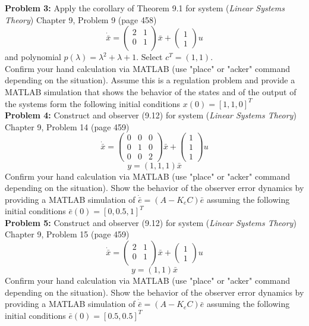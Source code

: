 \documentclass[12pt]{article}
\begin{document}
\noindent
\textbf{Problem 3:} Apply the corollary of Theorem 9.1 for system ({\em Linear Systems Theory}) Chapter 9, Problem 9 (page 458)
$$
\dot{\bar{x}}=
\begin{pmatrix}
	2 & 1 \\
	0 & 1 \\
\end{pmatrix}
\bar{x}+
\begin{pmatrix}
	1 \\
	1
\end{pmatrix} u
$$
and polynomial $p(\lambda)=\lambda^2+\lambda+1$. Select $c^T=(1, 1)$.\\
Confirm your hand calculation via MATLAB (use "place" or "acker" command depending on the situation). Assume this is a regulation problem and provide a MATLAB simulation that shows the behavior of the states and of the output of the systems form the following initial conditions $x(0)=[1,1,0]^T$\\

\noindent
\textbf{Problem 4:} Construct and observer (9.12) for system ({\em Linear Systems Theory}) Chapter 9, Problem 14 (page 459)
$$
\dot{\bar{x}}=
\begin{pmatrix}
	0 & 0 & 0 \\
	0 & 1 & 0 \\
	0 & 0 & 2
\end{pmatrix}
\bar{x}+
\begin{pmatrix}
	1 \\
	1 \\
	1
\end{pmatrix} u
$$
$$y=(1,1,1)\bar{x}$$
Confirm your hand calculation via MATLAB (use "place" or "acker" command depending on the situation). Show the behavior of the observer error dynamics by providing a MATLAB simulation of $\dot{\bar{e}}=(A-K_eC)\bar{e}$ assuming the following initial conditions $\bar{e}(0)=[0,0.5,1]^T$ \\

\noindent
\textbf{Problem 5:} Construct and observer (9.12) for system ({\em Linear Systems Theory}) Chapter 9, Problem 15 (page 459)
$$
\dot{\bar{x}}=
\begin{pmatrix}
	2 & 1 \\
	0 & 1 \\
\end{pmatrix}
\bar{x}+
\begin{pmatrix}
	1 \\
	1
\end{pmatrix} u
$$
$$y=(1,1)\bar{x}$$
Confirm your hand calculation via MATLAB (use "place" or "acker" command depending on the situation). Show the behavior of the observer error dynamics by providing a MATLAB simulation of $\dot{\bar{e}}=(A-K_eC)\bar{e}$ assuming the following initial conditions $\bar{e}(0)=[0.5, 0.5]^T$
\end{document}
